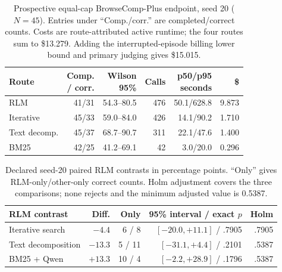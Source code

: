 \documentclass[letterpaper]{article}
\begin{document}
\begin{table}[!htbp]
\centering
\small
\setlength{\tabcolsep}{1pt}
\begin{tabular}{@{}lrrrrr@{}}
\toprule
\textbf{Route} & \shortstack{\textbf{Comp.}\\\textbf{/ corr.}} &
\shortstack{\textbf{Wilson}\\\textbf{95\%}} & \textbf{Calls} &
\shortstack{\textbf{p50/p95}\\\textbf{seconds}} & \textbf{\$} \\
\midrule
RLM & 41/31 & 54.3--80.5 & 476 & 50.1/628.8 & 9.873 \\
Iterative & 45/33 & 59.0--84.0 & 426 & 14.1/90.2 & 1.710 \\
Text decomp. & 45/37 & 68.7--90.7 & 311 & 22.1/47.6 & 1.400 \\
BM25 & 42/25 & 41.2--69.1 & 42 & 3.0/20.0 & 0.296 \\
\bottomrule
\end{tabular}
\caption{Prospective equal-cap BrowseComp-Plus endpoint, seed 20 ($N=45$).
Entries under ``Comp./corr.'' are completed/correct counts. Costs are
route-attributed active runtime; the four routes sum to \$13.279. Adding the
interrupted-episode billing lower bound and primary judging gives \$15.015.}
\label{tab:supp-browsecomp-equal-cap-seed20}
\end{table}

\begin{table}[!htbp]
\centering
\small
\setlength{\tabcolsep}{1pt}
\begin{tabular}{@{}lrrrr@{}}
\toprule
\textbf{RLM contrast} & \textbf{Diff.} & \textbf{Only} &
\shortstack{\textbf{95\% interval}\\\textbf{/ exact $p$}} & \textbf{Holm} \\
\midrule
Iterative search & $-4.4$ & 6 / 8 & $[-20.0,+11.1]$ / .7905 & .7905 \\
Text decomposition & $-13.3$ & 5 / 11 & $[-31.1,+4.4]$ / .2101 & .5387 \\
BM25 + Qwen & $+13.3$ & 10 / 4 & $[-2.2,+28.9]$ / .1796 & .5387 \\
\bottomrule
\end{tabular}
\caption{Declared seed-20 paired RLM contrasts in percentage points. ``Only''
gives RLM-only/other-only correct counts. Holm adjustment covers the three
comparisons; none rejects and the minimum adjusted value is 0.5387.}
\label{tab:supp-browsecomp-equal-cap-paired}
\end{table}
\end{document}
